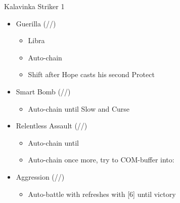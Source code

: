 \renewcommand{\first}{[1] Guerilla (\rav/\syn/\sab)}
\renewcommand{\second}{[2] Smart Bomb (\rav/\rav/\sab)}
\renewcommand{\third}{[3] Mystic Tower}
\renewcommand{\fourth}{[4] Relentless Assault (\rav/\rav/\com)}
\renewcommand{\fifth}{[5] Aggression (\com/\rav/\com)}
\newpage
\begin{battle}{Kalavinka Striker 1}
\begin{itemize}
    \item \first
    \begin{itemize}
        \item Libra
        \item Auto-chain
        \item Shift after Hope casts his second Protect
    \end{itemize}
    \item \second
    \begin{itemize}
        \item Auto-chain until Slow and Curse
    \end{itemize}
    \item \fourth
    \begin{itemize}
        \item Auto-chain until \stagger
        \item Auto-chain once more, try to COM-buffer into:
    \end{itemize}
    \item \fifth
    \begin{itemize}
        \item Auto-battle with refreshes with [6] until victory
    \end{itemize}
\end{itemize}
\end{battle}
